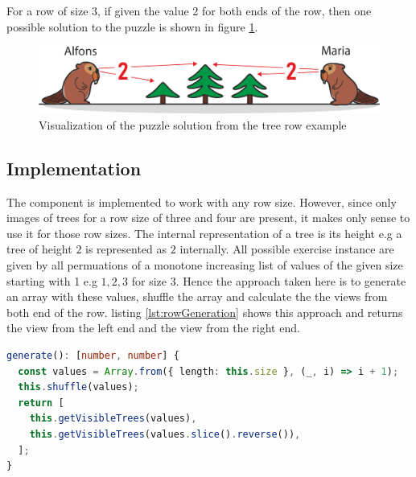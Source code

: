 \begin{example}
    For a row of size 3, if given the value 2 for both ends of the row, then one possible solution to the puzzle is shown in figure \ref{fig:tree_row_example}.
\end{example}

\begin{figure} 
    \centering
    \includegraphics[width=0.8 \columnwidth]{figures/tree_row_example.png}
    \caption{Visualization of the puzzle solution from the tree row example} 
    \label{fig:tree_row_example} 
\end{figure}

\subsection{Implementation}

The  component is implemented to work with any row size. However, since only images of trees for a row size of three and four are present, it makes only sense to use it for those row sizes.
The internal representation of a tree is its height e.g a tree of height $2$ is represented as $2$ internally.
All possible exercise instance are given by all permuations of a monotone increasing list of values of the given size starting with 1 e.g $1,2,3$ for size 3. Hence the approach taken here is to generate an array with these values, shuffle the array and calculate the the views from both end of the row. listing \ref{lst:rowGeneration} shows this approach and returns the view from the left end and the view from the right end.

\begin{lstlisting}[language=TypeScript,caption={Algorithm to generate a row of trees exercise instance of \code{this.size}},label={lst:rowGeneration}]
generate(): [number, number] {
  const values = Array.from({ length: this.size }, (_, i) => i + 1);
  this.shuffle(values);
  return [
    this.getVisibleTrees(values),
    this.getVisibleTrees(values.slice().reverse()),
  ];
}
\end{lstlisting}

